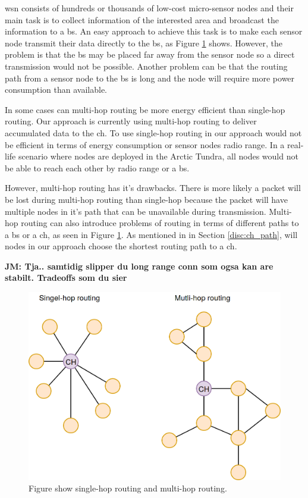 \documentclass[USenglish]{uit-thesis}
\begin{document}
\gls{wsn} consists of hundreds or thousands of low-cost micro-sensor nodes and their main task is to collect information of the interested area and broadcast the information to a \gls{bs}. An easy approach to achieve this task is to make each sensor node transmit their data directly to the \gls{bs}, as Figure \ref{fig:hopping} shows. However, the problem is that the \gls{bs} may be placed far away from the sensor node so a direct transmission would not be possible. Another problem can be that the routing path from a sensor node to the \gls{bs} is long and the node will require more power consumption than available.

In some cases can multi-hop routing be more energy efficient than single-hop routing\cite{hopping2}. Our approach is currently using multi-hop routing to deliver accumulated data to the \gls{ch}. To use single-hop routing in our approach would not be efficient in terms of energy consumption or sensor nodes radio range. In a real-life scenario where nodes are deployed in the Arctic Tundra, all nodes would not be able to reach each other by radio range or a \gls{bs}.

However, multi-hop routing has it's drawbacks. There is more likely a packet will be lost during multi-hop routing than single-hop because the packet will have multiple nodes in it's path that can be unavailable during transmission. Multi-hop routing can also introduce problems of routing in terms of different paths to a \gls{bs} or a \gls{ch}, as seen in Figure \ref{fig:hopping}. As mentioned in in Section \ref{disc:ch_path}, will nodes in our approach choose the shortest routing path to a \gls{ch}.

\textbf{JM: Tja.. samtidig slipper du long range conn som ogsa kan are stabilt. Tradeoffs som du sier }

\begin{figure} [ht]
\centering
\includegraphics[scale=0.35]{hopping.png}
\caption{Figure show single-hop routing and multi-hop routing.}
\label{fig:hopping}
\end{figure}
\end{document}
